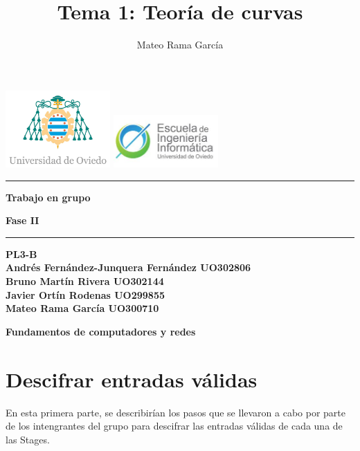 \documentclass[11pt,a4paper]{article}
\title{\textbf{Tema 1: } Teoría de curvas}
\author{Mateo Rama García}
\begin{document}
  
\begin{titlepage}
  \centering  
  \vspace*{1cm}  %
  \includegraphics[width=0.3\textwidth]{uniovi.jpg} \hspace{2cm}
  \includegraphics[width=0.3\textwidth]{descarga.jpeg} \\[1cm] 
  \vspace{\fill}%
  \hrule
  \vspace{0.5cm}
  {\Huge \bfseries Trabajo en grupo\par}
  \vspace{0.5cm}
  {\Large \bfseries Fase II\par}
  \vspace{0.5cm}
  \hrule
  \vspace{1cm}
  {\bfseries PL3-B \\ [3ex]
  Andrés Fernández-Junquera Fernández UO302806\\[3ex]
  Bruno Martín Rivera UO302144\\[3ex]
  Javier Ortín Rodenas UO299855\\[3ex]
  Mateo Rama García UO300710\par} %
  \vspace{\fill}  %
  {\Large \textbf{Fundamentos de computadores y redes}\par}
\end{titlepage}



\newpage

\tableofcontents

\newpage


\section{Descifrar entradas válidas}
En esta primera parte, se describirían los pasos que se llevaron a cabo por parte de los intengrantes 
del grupo para descifrar las entradas válidas de cada una de las Stages. 
\vspace{2ex}
\end{document}
